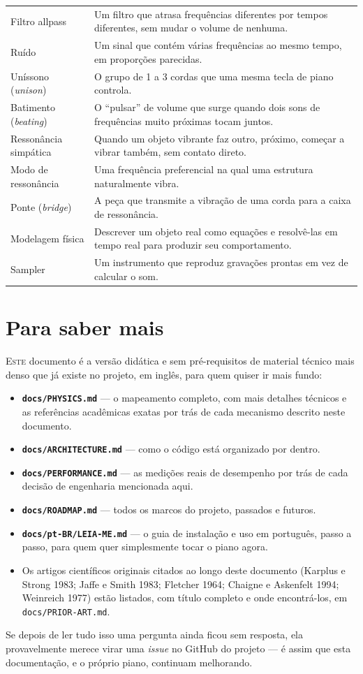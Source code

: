 \documentclass[11pt,oneside]{book}
\newcommand{\opening}[2]{\lettrine[lines=2,loversize=0.08,lraise=0.02]{#1}{#2}}
\begin{document}
\begin{center}
\begin{tabularx}{\linewidth}{p{4.4cm}X}
Filtro allpass & Um filtro que atrasa frequências diferentes por tempos diferentes, sem mudar o volume de nenhuma. \\
Ruído & Um sinal que contém várias frequências ao mesmo tempo, em proporções parecidas. \\
Uníssono (\emph{unison}) & O grupo de 1 a 3 cordas que uma mesma tecla de piano controla. \\
Batimento (\emph{beating}) & O \enquote{pulsar} de volume que surge quando dois sons de frequências muito próximas tocam juntos. \\
Ressonância simpática & Quando um objeto vibrante faz outro, próximo, começar a vibrar também, sem contato direto. \\
Modo de ressonância & Uma frequência preferencial na qual uma estrutura naturalmente vibra. \\
Ponte (\emph{bridge}) & A peça que transmite a vibração de uma corda para a caixa de ressonância. \\
Modelagem física & Descrever um objeto real como equações e resolvê-las em tempo real para produzir seu comportamento. \\
Sampler & Um instrumento que reproduz gravações prontas em vez de calcular o som. \\
\bottomrule
\end{tabularx}
\end{center}

\chapter*{Para saber mais}

\opening{E}{ste} documento é a versão didática e sem pré-requisitos de
material técnico mais denso que já existe no projeto, em inglês, para quem
quiser ir mais fundo:

\begin{itemize}
\item \textbf{\texttt{docs/PHYSICS.md}} --- o mapeamento completo, com mais
detalhes técnicos e as referências acadêmicas exatas por trás de cada
mecanismo descrito neste documento.
\item \textbf{\texttt{docs/ARCHITECTURE.md}} --- como o código está
organizado por dentro.
\item \textbf{\texttt{docs/PERFORMANCE.md}} --- as medições reais de
desempenho por trás de cada decisão de engenharia mencionada aqui.
\item \textbf{\texttt{docs/ROADMAP.md}} --- todos os marcos do projeto,
passados e futuros.
\item \textbf{\texttt{docs/pt-BR/LEIA-ME.md}} --- o guia de instalação e
uso em português, passo a passo, para quem quer simplesmente tocar o piano
agora.
\item Os artigos científicos originais citados ao longo deste documento
(Karplus e Strong 1983; Jaffe e Smith 1983; Fletcher 1964; Chaigne e
Askenfelt 1994; Weinreich 1977) estão listados, com título completo e onde
encontrá-los, em \texttt{docs/PRIOR-ART.md}.
\end{itemize}

Se depois de ler tudo isso uma pergunta ainda ficou sem resposta, ela
provavelmente merece virar uma \emph{issue} no GitHub do projeto --- é
assim que esta documentação, e o próprio piano, continuam melhorando.
\end{document}
